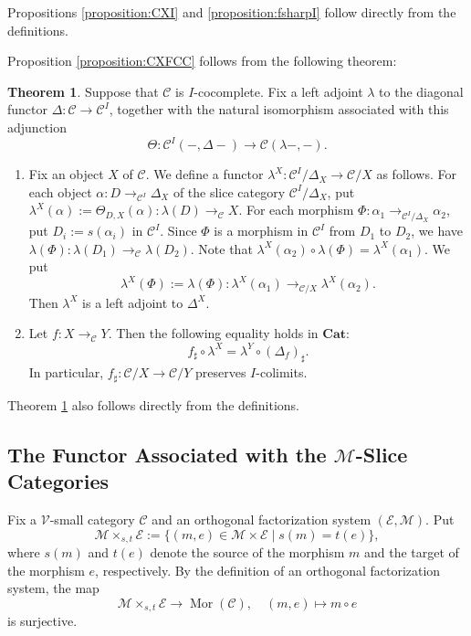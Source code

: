 \documentclass[12pt, a4paper]{amsart}
\theoremstyle{definition}
\newtheorem{theorem}{Theorem}[section]
\newcommand{\Mor}{\mathop{\mathrm{Mor}}\nolimits}
\newcommand{\Cat}{{\mathbf{Cat}}}
\begin{document}
Propositions \ref{proposition:CXI} and \ref{proposition:fsharpI} follow directly from the definitions.

Proposition \ref{proposition:CXFCC} follows from the following theorem:

\begin{theorem}\label{theorem:Icocompletenessofslice}
Suppose that $\mathcal{C}$ is $I$-cocomplete. Fix a left adjoint $\lambda$ to the diagonal functor $\Delta : \mathcal{C} \rightarrow \mathcal{C}^I$, together with the natural isomorphism associated with this adjunction
\[
\Theta : \mathcal{C}^I(-,\Delta -) \rightarrow \mathcal{C}(\lambda -,-).
\]
\begin{enumerate}
    \item Fix an object $X$ of $\mathcal{C}$. We define a functor $\lambda^X : \mathcal{C}^I/\Delta_X \rightarrow \mathcal{C}/X$ as follows. For each object $\alpha : D \rightarrow_{\mathcal{C}^I} \Delta_X$ of the slice category $\mathcal{C}^I/{\Delta_X}$, put $\lambda^X(\alpha) := \Theta_{D,X}(\alpha) : \lambda(D) \rightarrow_{\mathcal{C}} X$. For each morphism $\Phi : \alpha_1 \rightarrow_{\mathcal{C}^I/{\Delta_X}} \alpha_2$, put $D_i := s(\alpha_i)$ in $\mathcal{C}^I$. Since $\Phi$ is a morphism in $\mathcal{C}^I$ from $D_1$ to $D_2$, we have $\lambda(\Phi) : \lambda(D_1) \rightarrow_{\mathcal{C}} \lambda(D_2)$. Note that $\lambda^X(\alpha_2) \circ \lambda(\Phi) = \lambda^X(\alpha_1)$. We put
    \[
    \lambda^X(\Phi) := \lambda(\Phi) : \lambda^X(\alpha_1) \rightarrow_{\mathcal{C}/X} \lambda^X(\alpha_2).
    \]
    Then $\lambda^X$ is a left adjoint to $\Delta^X$.
    \item Let $f : X \rightarrow_{\mathcal{C}} Y$. Then the following equality holds in $\Cat$:
    \[
    f_\sharp \circ \lambda^X = \lambda^Y \circ (\Delta_f)_\sharp.
    \]
    In particular, $f_\sharp : \mathcal{C}/X \rightarrow \mathcal{C}/Y$ preserves $I$-colimits.
\end{enumerate}
\end{theorem}

Theorem \ref{theorem:Icocompletenessofslice} also follows directly from the definitions.

\subsection{The Functor Associated with the $\mathcal{M}$-Slice Categories}

Fix a $\mathcal{V}$-small category $\mathcal{C}$ and an orthogonal factorization system $(\mathcal{E},\mathcal{M})$. Put
\[
\mathcal{M} \times_{s,t} \mathcal{E} := \{ (m,e) \in \mathcal{M} \times \mathcal{E} \mid s(m) = t(e) \},
\]
where $s(m)$ and $t(e)$ denote the source of the morphism $m$ and the target of the morphism $e$, respectively. By the definition of an orthogonal factorization system, the map
\[
\mathcal{M} \times_{s,t} \mathcal{E} \rightarrow \Mor(\mathcal{C}), \quad (m,e) \mapsto m \circ e
\]
is surjective.
\end{document}
